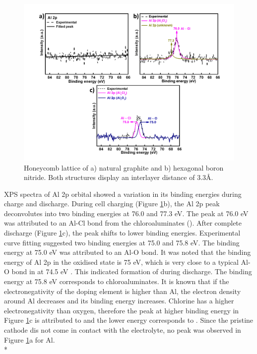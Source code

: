 \begin{figure}[tbh!]
\centering
\includegraphics[width=\textwidth]{Figures/BOhBN/hBNAlXPS}
\caption{Honeycomb lattice of a) natural graphite and b) hexagonal boron nitride. Both structures display an interlayer distance of 3.3\AA.}
\label{Figures/BOhBN:hBNAlXPS}
\end{figure}

XPS spectra of Al 2p orbital showed a variation in its binding energies during charge and discharge. During cell charging (Figure \ref{Figures/BOhBN:hBNAlXPS}b), the Al 2p peak deconvolutes into two binding energies at 76.0 and 77.3 eV. The peak at 76.0 eV was attributed to an Al-Cl bond from the chloroaluminates (). After complete discharge (Figure \ref{Figures/BOhBN:hBNAlXPS}c), the peak shifts to lower binding energies. Experimental curve fitting suggested two binding energies at 75.0 and 75.8 eV. The binding energy at 75.0 eV was attributed to an Al-O bond. It was noted that the binding energy of Al 2p in the oxidised state is 75 eV, which is very close to a typical Al-O bond in  at 74.5 eV \cite{}. This indicated formation of  during discharge. The binding energy at 75.8 eV corresponds to chloroaluminates. It is known that if the electronegativity of the doping element is higher than Al, the electron density around Al decreases and its binding energy increases. Chlorine has a higher electronegativity than oxygen, therefore the peak at higher binding energy in Figure \ref{Figures/BOhBN:hBNAlXPS}c is attributed to  and the lower energy corresponds to . Since the pristine cathode dis not come in contact with the electrolyte, no peak was observed in Figure \ref{Figures/BOhBN:hBNAlXPS}a for Al. \\*

